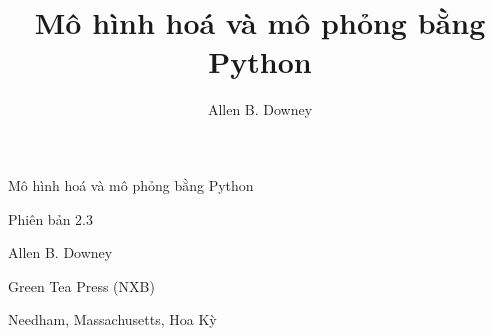 \documentclass[12pt, openany]{book}
\title{Mô hình hoá và mô phỏng bằng Python}
\author{Allen B. Downey}
\newcommand{\thetitle}{Mô hình hoá và mô phỏng bằng Python}
\newcommand{\theauthors}{Allen B. Downey}
\newcommand{\theversion}{2.3}
\theoremstyle{exercise}
\newcommand\blankpage{%
    \null
    \thispagestyle{empty}%
    \addtocounter{page}{-1}%
    \newpage}
\newif\ifplastex
\begin{document}
\frontmatter

\ifplastex

\maketitle

\else

\begin{latexonly}

%
%
%
%
%
%




\pagebreak
\thispagestyle{empty}

\begin{flushright}
\vspace*{2.0in}

\begin{spacing}{3}
{\huge \thetitle}
\end{spacing}

\vspace{0.25in}

Phiên bản \theversion

\vspace{1in}


{\Large
\theauthors \\
}


\vspace{0.5in}

{\Large Green Tea Press (NXB)}

{\small Needham, Massachusetts, Hoa Kỳ}

\vfill

\end{flushright}




\end{latexonly}
\end{document}
